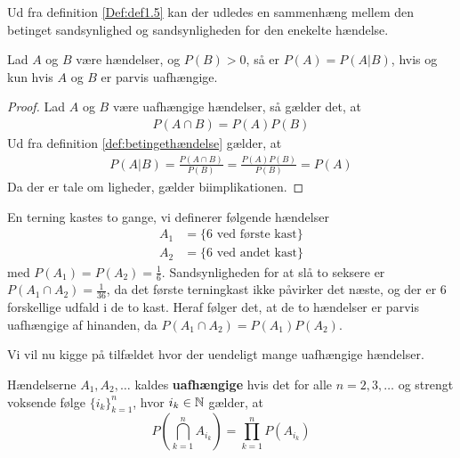 Ud fra definition \ref{Def:def1.5} kan der udledes en sammenhæng mellem den betinget sandsynlighed og sandsynligheden for den enekelte hændelse. 
\begin{cor} %
    Lad $A$ og $B$ være hændelser, og $P(B) > 0$, så er $P(A)=P(A|B)$, hvis og kun hvis $A$ og $B$ er parvis uafhængige.   
\end{cor}
\begin{proof}
Lad $A$ og $B$ være uafhængige hændelser, så gælder det, at 
\begin{align*}
    P(A\cap B)=P(A)P(B)
\end{align*}
Ud fra definition \ref{def:betingethændelse} gælder, at 
\begin{align*}
    P(A|B)=\frac{P(A\cap B)}{P(B)} =\frac{P(A)P(B)}{P(B)}=P(A)
\end{align*}
Da der er tale om ligheder, gælder biimplikationen.
\end{proof}

\begin{exmp} \label{exp:terning}
En terning kastes to gange, vi definerer følgende hændelser
\begin{align*}
  A_1 &=\{6 \text{ ved første kast}\} \\ A_2 &= \{6 \text{ ved andet kast}\} 
\end{align*}
med $P(A_1) = P(A_2) = \frac{1}{6}$. Sandsynligheden for at slå to seksere er $P(A_1 \cap A_2)=\frac{1}{36}$, da det første terningkast ikke påvirker det næste, og der er $6$ forskellige udfald i de to kast. Heraf følger det, at de to hændelser er parvis uafhængige af hinanden, da $P(A_1 \cap A_2) = P(A_1)P(A_2)$.
\end{exmp}

Vi vil nu kigge på tilfældet hvor der uendeligt mange uafhængige hændelser.
\begin{defn}
    Hændelserne $A_1, A_2, \ldots$ kaldes \textbf{uafhængige} hvis det for alle $n = 2, 3, \ldots$ og strengt voksende følge $\{i_k\}^n_{k = 1}$, hvor $i_k \in \mathbb{N}$ gælder, at
    \begin{equation*}
        P\left(\bigcap_{k = 1}^n A_{i_k} \right) = \prod_{k = 1}^n P(A_{i_k})
    \end{equation*}
\end{defn}

%


